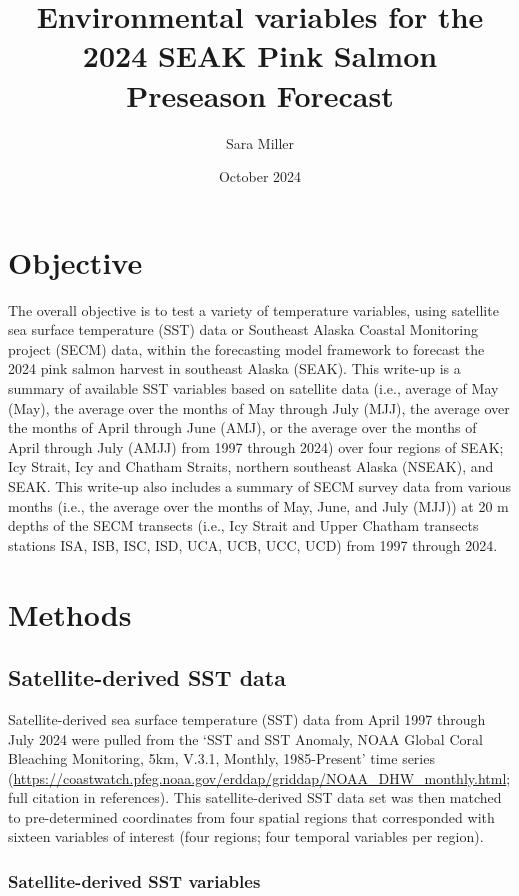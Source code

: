 \documentclass[
]{article}
\title{Environmental variables for the\\
2024 SEAK Pink Salmon Preseason Forecast}
\author{Sara Miller}
\date{October 2024}
\begin{document}
\maketitle

\section{Objective}\label{objective}

The overall objective is to test a variety of temperature variables,
using satellite sea surface temperature (SST) data or Southeast Alaska
Coastal Monitoring project (SECM) data, within the forecasting model
framework to forecast the 2024 pink salmon harvest in southeast Alaska
(SEAK). This write-up is a summary of available SST variables based on
satellite data (i.e., average of May (May), the average over the months
of May through July (MJJ), the average over the months of April through
June (AMJ), or the average over the months of April through July (AMJJ)
from 1997 through 2024) over four regions of SEAK; Icy Strait, Icy and
Chatham Straits, northern southeast Alaska (NSEAK), and SEAK. This
write-up also includes a summary of SECM survey data from various months
(i.e., the average over the months of May, June, and July (MJJ)) at 20 m
depths of the SECM transects (i.e., Icy Strait and Upper Chatham
transects stations ISA, ISB, ISC, ISD, UCA, UCB, UCC, UCD) from 1997
through 2024.

\section{Methods}\label{methods}

\subsection{Satellite-derived SST
data}\label{satellite-derived-sst-data}

Satellite-derived sea surface temperature (SST) data from April 1997
through July 2024 were pulled from the `SST and SST Anomaly, NOAA Global
Coral Bleaching Monitoring, 5km, V.3.1, Monthly, 1985-Present' time
series
(\url{https://coastwatch.pfeg.noaa.gov/erddap/griddap/NOAA_DHW_monthly.html};
full citation in references). This satellite-derived SST data set was
then matched to pre-determined coordinates from four spatial regions
that corresponded with sixteen variables of interest (four regions; four
temporal variables per region).

\subsubsection{Satellite-derived SST
variables}\label{satellite-derived-sst-variables}
\end{document}
